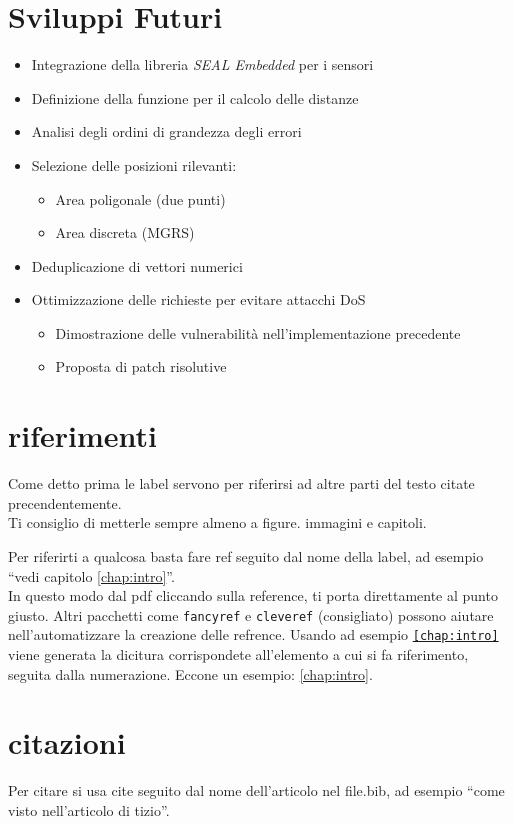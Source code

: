 \documentclass[12pt,a4paper,twoside]{book}
\begin{document}
\section{Sviluppi Futuri}
\begin{itemize}
    \item Integrazione della libreria \emph{SEAL Embedded} per i sensori
    \item Definizione della funzione per il calcolo delle distanze
    \item Analisi degli ordini di grandezza degli errori
    \item Selezione delle posizioni rilevanti:
    \begin{itemize}
        \item Area poligonale (due punti)
        \item Area discreta (MGRS)
    \end{itemize}
    \item Deduplicazione di vettori numerici
    \item Ottimizzazione delle richieste per evitare attacchi DoS
    \begin{itemize}
        \item Dimostrazione delle vulnerabilità nell'implementazione precedente
        \item Proposta di patch risolutive
    \end{itemize}
\end{itemize}


\section{riferimenti}
Come detto prima le label servono per riferirsi ad altre parti del testo citate precendentemente.\\
Ti consiglio di metterle sempre almeno a figure. immagini e capitoli.

Per riferirti a qualcosa basta fare ref seguito dal nome della label, ad esempio ``vedi capitolo \ref{chap:intro}''.\\In questo modo dal pdf cliccando sulla reference, ti porta direttamente al punto giusto.
Altri pacchetti come \texttt{fancyref} e \texttt{cleveref} (consigliato) possono aiutare nell'automatizzare la creazione delle refrence. Usando ad esempio \texttt{\cref{chap:intro}} viene generata la dicitura corrispondete all'elemento a cui si fa riferimento, seguita dalla numerazione. Eccone un esempio: \cref{chap:intro}.
\section{citazioni}
Per citare si usa cite seguito dal nome dell'articolo nel file.bib, ad esempio ``come visto nell'articolo di tizio\cite{greenwade93}''.
\end{document}
